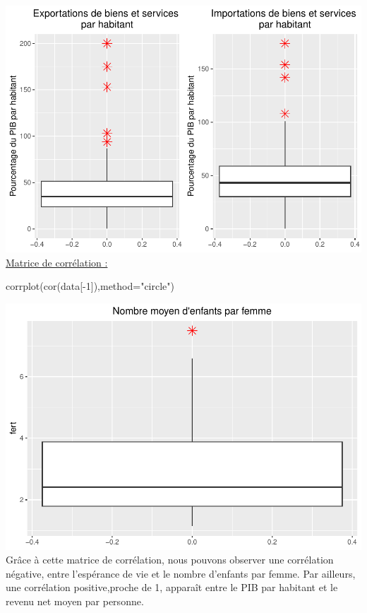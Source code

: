 \documentclass[
]{article}
\newenvironment{Shaded}{\begin{snugshade}}{\end{snugshade}}
\newcommand{\AttributeTok}[1]{\textcolor[rgb]{0.77,0.63,0.00}{#1}}
\newcommand{\DecValTok}[1]{\textcolor[rgb]{0.00,0.00,0.81}{#1}}
\newcommand{\FunctionTok}[1]{\textcolor[rgb]{0.00,0.00,0.00}{#1}}
\newcommand{\NormalTok}[1]{#1}
\newcommand{\SpecialCharTok}[1]{\textcolor[rgb]{0.00,0.00,0.00}{#1}}
\newcommand{\StringTok}[1]{\textcolor[rgb]{0.31,0.60,0.02}{#1}}
\begin{document}
\includegraphics{projet_apprentissage_non_supp_files/figure-latex/unnamed-chunk-10-1.pdf}
\uline{Matrice de corrélation :}

\begin{Shaded}
\begin{Highlighting}[]
\FunctionTok{corrplot}\NormalTok{(}\FunctionTok{cor}\NormalTok{(data[}\SpecialCharTok{{-}}\DecValTok{1}\NormalTok{]),}\AttributeTok{method=}\StringTok{"circle"}\NormalTok{)}
\end{Highlighting}
\end{Shaded}

\includegraphics{projet_apprentissage_non_supp_files/figure-latex/unnamed-chunk-11-1.pdf}
Grâce à cette matrice de corrélation, nous pouvons observer une
corrélation négative, entre l'espérance de vie et le nombre d'enfants
par femme. Par ailleurs, une corrélation positive,proche de 1, apparaît
entre le PIB par habitant et le revenu net moyen par personne.
\end{document}
